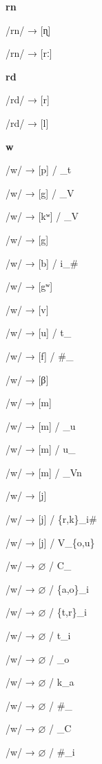 \begin{center}\textbf{rn}\end{center}
\begin{multicols}{4}
\noindent /rn/ → [ɳ]

\noindent /rn/ → [rː]
\end{multicols}


\begin{center}\textbf{rd}\end{center}
\begin{multicols}{4}
\noindent /rd/ → [r]

\noindent /rd/ → [l]
\end{multicols}


\begin{center}\textbf{w}\end{center}
\begin{multicols}{4}
\noindent /w/ → [p] / \_t

\noindent /w/ → [g] / \_V

\noindent /w/ → [kʷ] / \_V

\noindent /w/ → [g]

\noindent /w/ → [b] / i\_\#

\noindent /w/ → [gʷ]

\noindent /w/ → [v]

\noindent /w/ → [u] / t\_

\noindent /w/ → [f] / \#\_

\noindent /w/ → [β]

\noindent /w/ → [m]

\noindent /w/ → [m] / \_u

\noindent /w/ → [m] / u\_

\noindent /w/ → [m] / \_Vn

\noindent /w/ → [j]

\noindent /w/ → [j] / \{r,k\}\_i\#

\noindent /w/ → [j] / V\_\{o,u\}

\noindent /w/ → $\varnothing$ / C\_

\noindent /w/ → $\varnothing$ / \{a,o\}\_i

\noindent /w/ → $\varnothing$ / \{t,r\}\_i

\noindent /w/ → $\varnothing$ / t\_i

\noindent /w/ → $\varnothing$ / \_o

\noindent /w/ → $\varnothing$ / k\_a

\noindent /w/ → $\varnothing$ / \#\_

\noindent /w/ → $\varnothing$ / \_C

\noindent /w/ → $\varnothing$ / \#\_i
\end{multicols}


